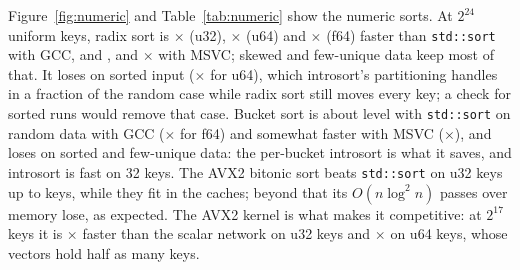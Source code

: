 \documentclass[11pt]{article}
\theoremstyle{definition}
\begin{document}
Figure~\ref{fig:numeric} and Table~\ref{tab:numeric} show the numeric
sorts. At $2^{24}$ uniform keys, radix sort is
$\times$ (u32),
$\times$ (u64) and
$\times$ (f64) faster than
\texttt{std::sort} with GCC, and ,
 and
$\times$ with MSVC; skewed and
few-unique data keep most of that. It loses on sorted input
($\times$ for u64), which introsort's
partitioning handles in a fraction of the random case while radix sort still
moves every key; a check for sorted runs would remove that case. Bucket sort
is about level with \texttt{std::sort} on random data with GCC
($\times$ for f64) and somewhat faster
with MSVC ($\times$), and loses on
sorted and few-unique data: the per-bucket introsort is what it saves, and
introsort is fast on 32 keys. The AVX2 bitonic sort beats \texttt{std::sort}
on u32 keys up to  keys, while they fit in
the caches; beyond that its $O(n \log^2 n)$ passes over memory lose, as
expected. The AVX2 kernel is what makes it competitive: at $2^{17}$ keys it is
$\times$ faster than the scalar network on u32
keys and $\times$ on u64 keys, whose vectors
hold half as many keys.
\end{document}
